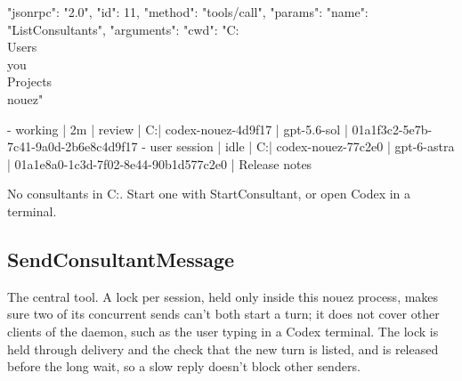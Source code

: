 \documentclass[10pt,a4paper]{article}
\begin{document}
\begin{wire}[Request]
{"jsonrpc": "2.0", "id": 11, "method": "tools/call", "params": {"name": "ListConsultants",
  "arguments": {"cwd": "C:\\Users\\you\\Projects\\nouez"}}}
\end{wire}
\begin{plain}
- working | 2m | review | C:\Users\you\Projects\nouez | codex-nouez-4d9f17 | gpt-5.6-sol | 01a1f3c2-5e7b-7c41-9a0d-2b6e8c4d9f17
- user session | idle | C:\Users\you\Projects\nouez | codex-nouez-77c2e0 | gpt-6-astra | 01a1e8a0-1c3d-7f02-8e44-90b1d577c2e0 | Release notes
\end{plain}
\begin{plain}
No consultants in C:\Users\you\Projects\nouez. Start one with StartConsultant, or open Codex in a terminal.
\end{plain}

\subsection{SendConsultantMessage}
\label{sec:send}

The central tool. A lock per session, held only inside this nouez process, makes sure two of its
concurrent sends can't both start a turn; it does not cover other clients of the daemon, such as
the user typing in a Codex terminal. The lock is held through delivery and the check that the new
turn is listed, and is released before the long wait, so a slow reply
doesn't block other senders.
\end{document}
